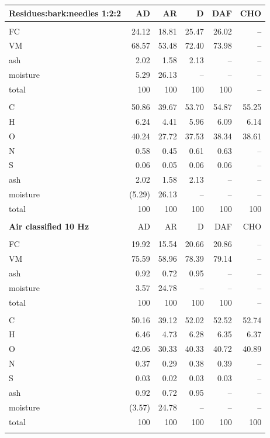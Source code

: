 \begin{longtable}{lrrrrr}
    \textbf{Residues:bark:needles 1:2:2} & AD & AR & D & DAF & CHO \\
    \hline \\
    FC       & 24.12  & 18.81  & 25.47  & 26.02  & -- \\
    VM       & 68.57  & 53.48  & 72.40  & 73.98  & -- \\
    ash      & 2.02   & 1.58   & 2.13   & --     & -- \\
    moisture & 5.29   & 26.13  & --     & --     & -- \\
    total    & 100    & 100    & 100    & 100    & -- \\
    \\
    C        & 50.86  & 39.67  & 53.70  & 54.87  & 55.25 \\
    H        & 6.24   & 4.41   & 5.96   & 6.09   & 6.14 \\
    O        & 40.24  & 27.72  & 37.53  & 38.34  & 38.61 \\
    N        & 0.58   & 0.45   & 0.61   & 0.63   & -- \\
    S        & 0.06   & 0.05   & 0.06   & 0.06   & -- \\
    ash      & 2.02   & 1.58   & 2.13   & --     & -- \\
    moisture & (5.29) & 26.13  & --     & --     & -- \\
    total    & 100    & 100    & 100    & 100    & 100 \\
    \\

    \textbf{Air classified 10 Hz} & AD & AR & D & DAF & CHO \\
    \hline \\
    FC       & 19.92  & 15.54  & 20.66  & 20.86  & -- \\
    VM       & 75.59  & 58.96  & 78.39  & 79.14  & -- \\
    ash      & 0.92   & 0.72   & 0.95   & --     & -- \\
    moisture & 3.57   & 24.78  & --     & --     & -- \\
    total    & 100    & 100    & 100    & 100    & -- \\
    \\
    C        & 50.16  & 39.12  & 52.02  & 52.52  & 52.74 \\
    H        & 6.46   & 4.73   & 6.28   & 6.35   & 6.37 \\
    O        & 42.06  & 30.33  & 40.33  & 40.72  & 40.89 \\
    N        & 0.37   & 0.29   & 0.38   & 0.39   & -- \\
    S        & 0.03   & 0.02   & 0.03   & 0.03   & -- \\
    ash      & 0.92   & 0.72   & 0.95   & --     & -- \\
    moisture & (3.57) & 24.78  & --     & --     & -- \\
    total    & 100    & 100    & 100    & 100    & 100 \\
    \\


\end{longtable}
